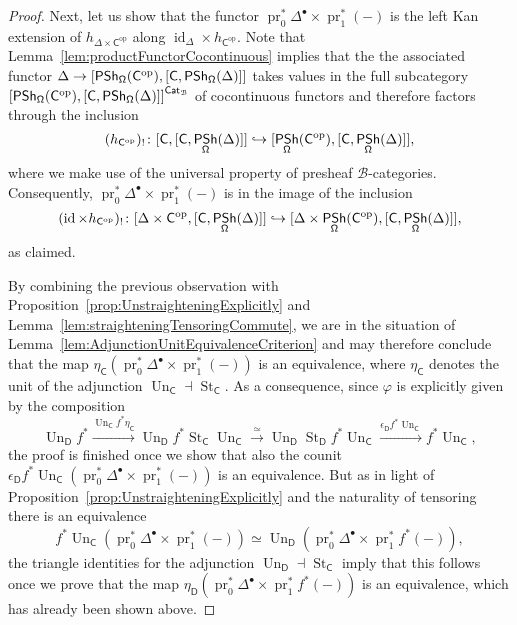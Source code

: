 \documentclass[reqno]{amsart}
\numberwithin{equation}{subsection}
\theoremstyle{plain}
\theoremstyle{definition}
\let\scr=\mathcal
\let\phi=\varphi
\let\into=\hookrightarrow
\def\BB{\scr B}
\DeclareMathOperator{\id}{id}
\DeclareMathOperator{\IPSh}{\mathsf{PSh}}
\DeclareMathOperator{\ICat}{\mathsf{Cat}}
\DeclareMathOperator{\pr}{pr}
\DeclareMathOperator{\St}{St}
\DeclareMathOperator{\Un}{Un}
\newcommand{\op}{\mathrm{op}}
\newcommand{\I}[1]{\mathsf{#1}}
\newcommand{\iFun}[2]{{[#1,#2]}}
\begin{document}
\begin{proof}
	Next, let us show that the functor $\pr_0^\ast\Delta^{\bullet}\times\pr_1^\ast(-)$ is the left Kan extension of $h_{\Delta\times\I{C}^{\op}}$ along $\id_{\Delta}\times h_{\I{C}^{\op}}$. Note that Lemma~\ref{lem:productFunctorCocontinuous} implies that the the associated functor $\Delta\to \iFun{\IPSh_{\Univ}(\I{C}^{\op})}{\iFun{\I{C}}{\IPSh_{\Univ}(\Delta)}}$ takes values in the full subcategory $\iFun{\IPSh_{\Univ}(\I{C}^{\op})}{\iFun{\I{C}}{\IPSh_{\Univ}(\Delta)}}^{\ICat_{\BB}}$ of cocontinuous functors and therefore factors through the inclusion 
	\begin{equation*}
	(h_{\I{C}^{\op}})_!\colon \iFun{\I{C}}{\iFun{\I{C}}{\IPSh_{\Univ}(\Delta)}}\into\iFun{\IPSh_{\Univ}(\I{C}^{\op})}{\iFun{\I{C}}{\IPSh_{\Univ}(\Delta)}},
	\end{equation*}
	where we make use of the universal property of presheaf $\BB$-categories.
	Consequently, $\pr_0^\ast\Delta^{\bullet}\times\pr_1^\ast(-)$ is in the image of the inclusion
	\begin{equation*}
	(\id\times h_{\I{C}^{\op}})_!\colon \iFun{\Delta\times\I{C}^{\op}}{\iFun{\I{C}}{\IPSh_{\Univ}(\Delta)}}\into \iFun{\Delta\times\IPSh_{\Univ}(\I{C}^{\op})}{\iFun{\I{C}}{\IPSh_{\Univ}(\Delta)}},
	\end{equation*}
	as claimed. 
	
	By combining the previous observation with Proposition~\ref{prop:UnstraighteningExplicitly} and Lemma~\ref{lem:straighteningTensoringCommute}, we are in the situation of Lemma~\ref{lem:AdjunctionUnitEquivalenceCriterion} and may therefore conclude that the map $\eta_{\I{C}}(\pr_0^\ast\Delta^{\bullet}\times\pr_1^\ast(-))$ is an equivalence, where $\eta_{\I{C}}$ denotes the unit of the adjunction $\Un_{\I{C}}\dashv\St_{\I{C}}$. As a consequence, since $\phi$ is explicitly given by the composition
	\begin{equation*}
	\Un_{\I{D}}f^\ast \xrightarrow{\Un_{\I{C}}f^\ast\eta_{\I{C}}} \Un_{\I{D}}f^\ast\St_{\I{C}}\Un_{\I{C}}\xrightarrow{\simeq} \Un_{\I{D}}\St_{\I{D}}f^\ast\Un_{\I{C}}\xrightarrow{\epsilon_{\I{D}}f^\ast\Un_{\I{C}}} f^\ast\Un_{\I{C}},
	\end{equation*}
	the proof is finished once we show that also the counit $\epsilon_{\I{D}}f^\ast\Un_{\I{C}}(\pr_0^\ast\Delta^{\bullet}\times\pr_1^\ast(-))$ is an equivalence. But as in light of Proposition~\ref{prop:UnstraighteningExplicitly} and the naturality of tensoring there is an equivalence
	\begin{equation*}
	f^\ast\Un_{\I{C}}(\pr_0^\ast\Delta^{\bullet}\times\pr_1^\ast(-))\simeq \Un_{\I{D}}(\pr_0^\ast\Delta^{\bullet}\times\pr_1^\ast f^\ast(-)),
	\end{equation*}
	the triangle identities for the adjunction $\Un_{\I{D}}\dashv \St_{\I{C}}$ imply that this follows once we prove that the map $\eta_{\I{D}}(\pr_0^\ast\Delta^{\bullet}\times\pr_1^\ast f^\ast(-))$ is an equivalence, which has already been shown above.
\end{proof}
\end{document}

